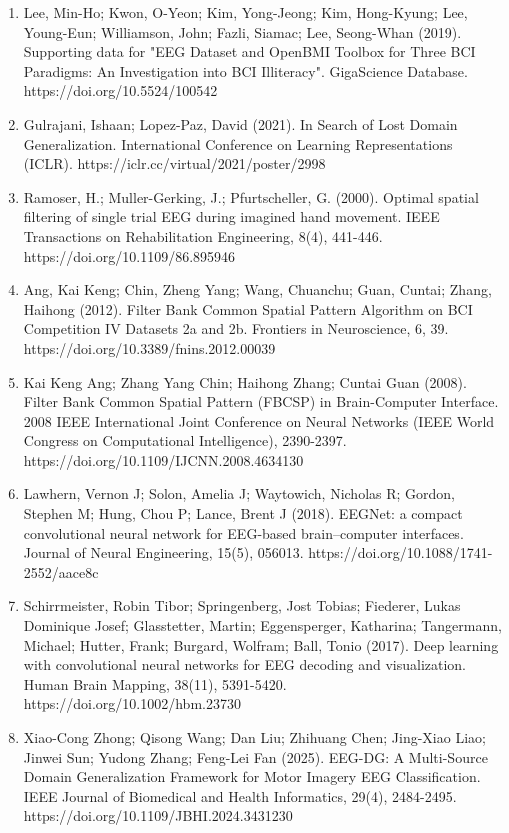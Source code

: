 \documentclass[11pt]{article}
\begin{document}
\begin{enumerate}
\item Lee, Min-Ho; Kwon, O-Yeon; Kim, Yong-Jeong; Kim, Hong-Kyung; Lee, Young-Eun; Williamson, John; Fazli, Siamac; Lee, Seong-Whan (2019). Supporting data for "EEG Dataset and OpenBMI Toolbox for Three BCI Paradigms: An Investigation into BCI Illiteracy". GigaScience Database. https://doi.org/10.5524/100542
\item Gulrajani, Ishaan; Lopez-Paz, David (2021). In Search of Lost Domain Generalization. International Conference on Learning Representations (ICLR). https://iclr.cc/virtual/2021/poster/2998
\item Ramoser, H.; Muller-Gerking, J.; Pfurtscheller, G. (2000). Optimal spatial filtering of single trial EEG during imagined hand movement. IEEE Transactions on Rehabilitation Engineering, 8(4), 441-446. https://doi.org/10.1109/86.895946
\item Ang, Kai Keng; Chin, Zheng Yang; Wang, Chuanchu; Guan, Cuntai; Zhang, Haihong (2012). Filter Bank Common Spatial Pattern Algorithm on BCI Competition IV Datasets 2a and 2b. Frontiers in Neuroscience, 6, 39. https://doi.org/10.3389/fnins.2012.00039
\item Kai Keng Ang; Zhang Yang Chin; Haihong Zhang; Cuntai Guan (2008). Filter Bank Common Spatial Pattern (FBCSP) in Brain-Computer Interface. 2008 IEEE International Joint Conference on Neural Networks (IEEE World Congress on Computational Intelligence), 2390-2397. https://doi.org/10.1109/IJCNN.2008.4634130
\item Lawhern, Vernon J; Solon, Amelia J; Waytowich, Nicholas R; Gordon, Stephen M; Hung, Chou P; Lance, Brent J (2018). EEGNet: a compact convolutional neural network for EEG-based brain--computer interfaces. Journal of Neural Engineering, 15(5), 056013. https://doi.org/10.1088/1741-2552/aace8c
\item Schirrmeister, Robin Tibor; Springenberg, Jost Tobias; Fiederer, Lukas Dominique Josef; Glasstetter, Martin; Eggensperger, Katharina; Tangermann, Michael; Hutter, Frank; Burgard, Wolfram; Ball, Tonio (2017). Deep learning with convolutional neural networks for EEG decoding and visualization. Human Brain Mapping, 38(11), 5391-5420. https://doi.org/10.1002/hbm.23730
\item Xiao-Cong Zhong; Qisong Wang; Dan Liu; Zhihuang Chen; Jing-Xiao Liao; Jinwei Sun; Yudong Zhang; Feng-Lei Fan (2025). EEG-DG: A Multi-Source Domain Generalization Framework for Motor Imagery EEG Classification. IEEE Journal of Biomedical and Health Informatics, 29(4), 2484-2495. https://doi.org/10.1109/JBHI.2024.3431230

\end{enumerate}
\end{document}

